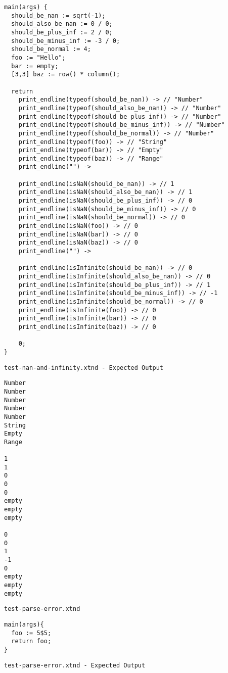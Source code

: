 \begin{lstlisting}
main(args) {
  should_be_nan := sqrt(-1);
  should_also_be_nan := 0 / 0;
  should_be_plus_inf := 2 / 0;
  should_be_minus_inf := -3 / 0;
  should_be_normal := 4;
  foo := "Hello";
  bar := empty;
  [3,3] baz := row() * column();

  return
    print_endline(typeof(should_be_nan)) -> // "Number"
    print_endline(typeof(should_also_be_nan)) -> // "Number"
    print_endline(typeof(should_be_plus_inf)) -> // "Number"
    print_endline(typeof(should_be_minus_inf)) -> // "Number"
    print_endline(typeof(should_be_normal)) -> // "Number"
    print_endline(typeof(foo)) -> // "String"
    print_endline(typeof(bar)) -> // "Empty"
    print_endline(typeof(baz)) -> // "Range"
    print_endline("") ->

    print_endline(isNaN(should_be_nan)) -> // 1
    print_endline(isNaN(should_also_be_nan)) -> // 1
    print_endline(isNaN(should_be_plus_inf)) -> // 0
    print_endline(isNaN(should_be_minus_inf)) -> // 0
    print_endline(isNaN(should_be_normal)) -> // 0
    print_endline(isNaN(foo)) -> // 0
    print_endline(isNaN(bar)) -> // 0
    print_endline(isNaN(baz)) -> // 0
    print_endline("") ->

    print_endline(isInfinite(should_be_nan)) -> // 0
    print_endline(isInfinite(should_also_be_nan)) -> // 0
    print_endline(isInfinite(should_be_plus_inf)) -> // 1
    print_endline(isInfinite(should_be_minus_inf)) -> // -1
    print_endline(isInfinite(should_be_normal)) -> // 0
    print_endline(isInfinite(foo)) -> // 0
    print_endline(isInfinite(bar)) -> // 0
    print_endline(isInfinite(baz)) -> // 0

    0;
}
\end{lstlisting}


\medskip \noindent \texttt{test-nan-and-infinity.xtnd - Expected Output}


\begin{lstlisting}
Number
Number
Number
Number
Number
String
Empty
Range

1
1
0
0
0
empty
empty
empty

0
0
1
-1
0
empty
empty
empty
\end{lstlisting}


\medskip \noindent \texttt{test-parse-error.xtnd}


\begin{lstlisting}
main(args){
  foo := 5$5;
  return foo;
}
\end{lstlisting}


\medskip \noindent \texttt{test-parse-error.xtnd - Expected Output}



